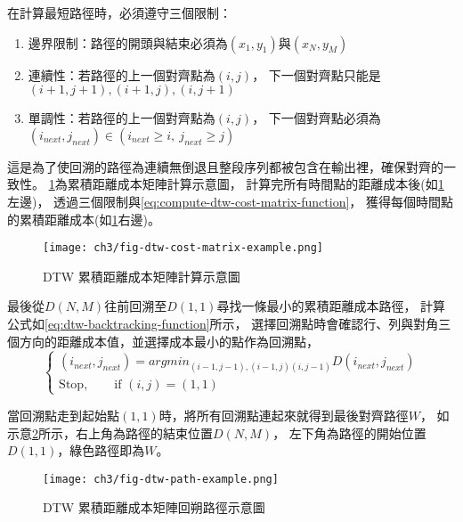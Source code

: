 \documentclass[class=NCU_thesis, crop=false]{standalone}
\begin{document}
在計算最短路徑時，必須遵守三個限制：
\begin{enumerate}
    \item 邊界限制：路徑的開頭與結束必須為$(x_1,y_1)$與$(x_N,y_M)$
    \item 連續性：若路徑的上一個對齊點為$(i, j)$， 
    下一個對齊點只能是$(i+1, j+1), (i+1, j), (i, j+1)$
    \item 單調性：若路徑的上一個對齊點為$(i, j)$，
    下一個對齊點必須為$(i_{next}, j_{next}) \in (i_{next} \geq i,\ j_{next} \geq j)$
\end{enumerate}

這是為了使回溯的路徑為連續無倒退且整段序列都被包含在輸出裡，確保對齊的一致性。
\cref{fig:fig-ch3-dtw-cost-matrix-example}為累積距離成本矩陣計算示意圖，
計算完所有時間點的距離成本後(如\cref{fig:fig-ch3-dtw-cost-matrix-example}左邊)，
透過三個限制與\cref{eq:compute-dtw-cost-matrix-function}，
獲得每個時間點的累積距離成本(如\cref{fig:fig-ch3-dtw-cost-matrix-example}右邊)。

\begin{figure}[H]
    \centering
    \texttt{[image: ch3/fig-dtw-cost-matrix-example.png]}
    \caption{DTW 累積距離成本矩陣計算示意圖}
    \label{fig:fig-ch3-dtw-cost-matrix-example}
\end{figure}

最後從$D(N, M)$往前回溯至$D(1, 1)$尋找一條最小的累積距離成本路徑，
計算公式如\cref{eq:dtw-backtracking-function}所示，
選擇回溯點時會確認行、列與對角三個方向的距離成本值，並選擇成本最小的點作為回溯點，
\begin{equation} 
    \label{eq:dtw-backtracking-function}
    \begin{cases}
        \text{$(i_{next}, j_{next}) = argmin_{(i-1,j-1),(i-1,j)(i,j-1)}D(i_{next}, j_{next})$} \\
        \text{Stop},\qquad \text{if $(i, j) = (1, 1)$} 
    \end{cases}
\end{equation}

當回溯點走到起始點$(1, 1)$時，將所有回溯點連起來就得到最後對齊路徑$W$，
如示意\cref{fig:fig-ch3-dtw-path-example}所示，右上角為路徑的結束位置$D(N, M)$，
左下角為路徑的開始位置$D(1, 1)$，綠色路徑即為$W$。
\begin{figure}[!hbt]
    \centering
    \texttt{[image: ch3/fig-dtw-path-example.png]}
    \caption{DTW 累積距離成本矩陣回朔路徑示意圖}
    \label{fig:fig-ch3-dtw-path-example}
\end{figure}
\end{document}
